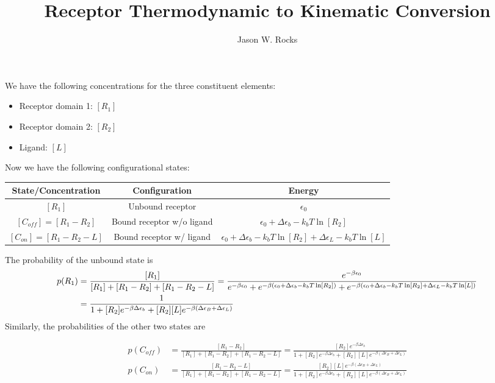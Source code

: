 \documentclass[aps,onecolumn,superscriptaddress, notitlepage]{revtex4-1}
\begin{document}
\title{Receptor Thermodynamic to Kinematic Conversion}

\author{Jason W. Rocks}
\maketitle


We have the following concentrations for the three constituent elements:
\begin{itemize}
\item Receptor domain 1: $[R_1]$
\item Receptor domain 2: $[R_2]$
\item Ligand: $[L]$
\end{itemize}

Now we have the following configurational states:
\begin{center}
\begin{tabular}{ |c|c|c| } 
 \hline
 State/Concentration & Configuration & Energy \\\hline 
 $[R_1]$ & Unbound receptor  & $\epsilon_0$ \\ 
 $[C_{off}] = [R_1-R_2]$ & Bound receptor w/o ligand & $\epsilon_0+\Delta\epsilon_b-k_bT\ln [R_2]$  \\ 
 $[C_{on}] = [R_1-R_2-L]$ & Bound receptor w/ ligand  & $\epsilon_0+\Delta\epsilon_b-k_bT\ln [R_2] + \Delta\epsilon_L-k_bT\ln [L]$ \\
 \hline
\end{tabular}
\end{center}


The probability of the unbound state is
\begin{align}
p(R_1) &= \frac{[R_1]}{[R_1]+[R_1-R_2]+[R_1-R_2-L]} = \frac{e^{-\beta\epsilon_0}}{e^{-\beta\epsilon_0} + e^{-\beta\qty(\epsilon_0+\Delta\epsilon_b-k_bT\ln [R_2])} +  e^{-\beta\qty(\epsilon_0+\Delta\epsilon_b-k_bT\ln [R_2] + \Delta\epsilon_L-k_bT\ln [L])}}\\
&= \frac{1}{1 +   [R_2]e^{-\beta\Delta\epsilon_b}  +  [R_2][L]e^{-\beta(\Delta\epsilon_B+\Delta\epsilon_L)} }
\end{align}
Similarly, the probabilities of the other two states are 

\begin{align}
p(C_{off}) &=  \frac{[R_1-R_2]}{[R_1]+[R_1-R_2]+[R_1-R_2-L]} =  \frac{[R_2]e^{-\beta\Delta\epsilon_b}}{1 +   [R_2]e^{-\beta\Delta\epsilon_b}  +  [R_2][L]e^{-\beta(\Delta\epsilon_B+\Delta\epsilon_L)}}\\
p(C_{on}) &=  \frac{[R_1-R_2-L]}{[R_1]+[R_1-R_2]+[R_1-R_2-L]} =  \frac{ [R_2][L]e^{-\beta(\Delta\epsilon_B+\Delta\epsilon_L)}}{1 +   [R_2]e^{-\beta\Delta\epsilon_b}  +  [R_2][L]e^{-\beta(\Delta\epsilon_B+\Delta\epsilon_L)}}\\
\end{align}
\end{document}
